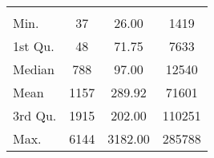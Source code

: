 \begin{tabular}{lS[table-format=5.1]S[table-format=5.1]S[table-format=5.1]}
&  &  &  \\
 Min.    & 37 & 26.00 & 1419 \\
 1st Qu. & 48 & 71.75 & 7633 \\
 Median  & 788 & 97.00 & 12540 \\
 Mean    & 1157 & 289.92 & 71601 \\
 3rd Qu. & 1915 & 202.00 & 110251 \\
 Max.    & 6144 & 3182.00 & 285788 \\
\end{tabular}
